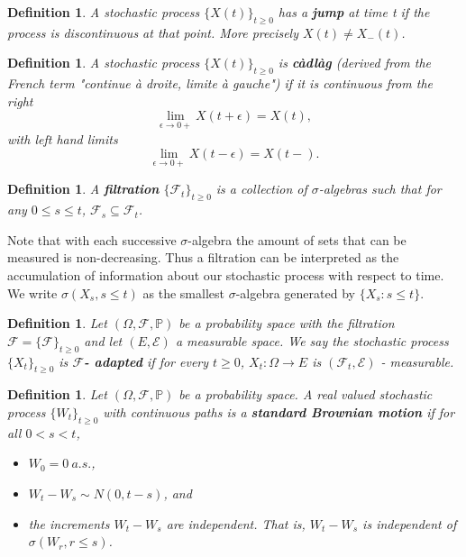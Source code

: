 \documentclass[honours,12pt]{unswthesis}
\newcommand{\PP}{\mathbb{P}}
\newcommand{\1}{\mathbf 1}
\newcommand{\FF}{\mathcal{F}}
\newtheorem{definition}[equation]{Definition}
\numberwithin{equation}{section}
\theoremstyle{definition}
\theoremstyle{remark}
\begin{document}
\begin{definition}
A stochastic process $\{X(t)\}_{t\geq 0}$ has a \textbf{jump} at time t if the process is discontinuous at that point. More precisely $X(t) \neq X_-(t)$.\\
\end{definition}

\begin{definition}
A stochastic process $\{X(t)\}_{t\geq 0}$ is \textbf{c\`{a}dl\`{a}g} (derived from the French term "continue \`{a} droite, limite \`{a} gauche") if it is continuous from the right
\[
	\lim_{\epsilon\to0+}X(t+\epsilon)=X(t),
\]
with left hand limits
\[
	\lim_{\epsilon\to0+}X(t-\epsilon)=X(t-).
\]
\end{definition}

\begin{definition}
A \textbf{filtration} $\{\FF_t\}_{t\geq 0}$ is a collection of $\sigma$-algebras such that for any $0\leq s \leq t$, $\FF_s \subseteq \FF_t$.\\
\end{definition}

{\noindent}Note that with each successive $\sigma$-algebra the amount of sets that can be measured is non-decreasing. Thus a filtration can be interpreted as the accumulation of information about our stochastic process with respect to time. We write $\sigma(X_s,s\leq t)$ as the smallest $\sigma$-algebra generated by $\{X_s: s\leq t\}$.\\

\begin{definition}
Let $(\Omega,\FF,\PP)$ be a probability space with the filtration $\FF = \{\FF\}_{t\geq 0}$ and let $(E,\mathcal{E})$ a measurable space. We say the stochastic process $\{X_t\}_{t\geq 0}$ is $\boldsymbol{\FF}$\textbf{- adapted} if for every $t\geq 0$, $X_t: \Omega \rightarrow E$ is $(\FF_t, \mathcal{E})$ - measurable.\\
\end{definition}

\begin{definition}
Let $(\Omega, \FF,\PP)$ be a probability space. A real valued stochastic process $\{W_t\}_{t\geq 0}$ with continuous paths is a \textbf{standard Brownian motion} if for all $0<s<t$,
\begin{itemize}
\item $W_0 = 0\ a.s.$,
\item $W_t - W_s \sim N(0,t-s)$, and
\item the increments $W_t - W_s$ are independent. That is, $W_t - W_s$ is independent of $\sigma(W_r,r\leq s)$.\\
\end{itemize}
\end{definition}
\end{document}
